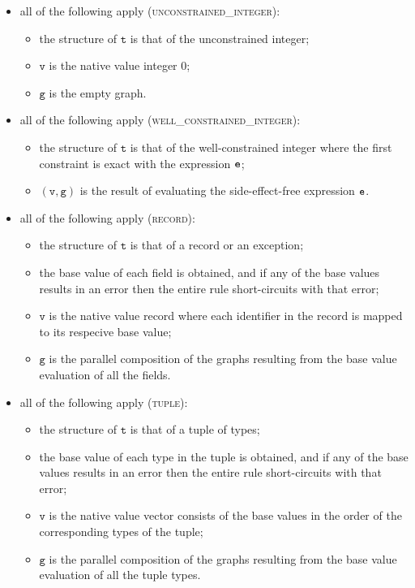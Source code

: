 \documentclass{book}
\newcommand\vg[0]{\texttt{g}}
\newcommand\vv[0]{\texttt{v}}
\newcommand\vt[0]{\texttt{t}}
\begin{document}
\begin{itemize}
  \item all of the following apply (\textsc{unconstrained\_integer}):
  \begin{itemize}
    \item the structure of $\vt$ is that of the unconstrained integer;
    \item $\vv$ is the native value integer $0$;
    \item $\vg$ is the empty graph.
  \end{itemize}

  \item all of the following apply (\textsc{well\_constrained\_integer}):
  \begin{itemize}
    \item the structure of $\vt$ is that of the well-constrained integer where the first constraint
    is exact with the expression $\texttt{e}$;
    \item $(\vv, \vg)$ is the result of evaluating the side-effect-free expression $\texttt{e}$.
  \end{itemize}

  \item all of the following apply (\textsc{record}):
  \begin{itemize}
    \item the structure of $\vt$ is that of a record or an exception;
    \item the base value of each field is obtained, and if any of the base values results in an error
    then the entire rule short-circuits with that error;
    \item $\vv$ is the native value record where each identifier in the record is mapped to its
    respecive base value;
    \item $\vg$ is the parallel composition of the graphs resulting from the base value evaluation
    of all the fields.
  \end{itemize}

  \item all of the following apply (\textsc{tuple}):
  \begin{itemize}
    \item the structure of $\vt$ is that of a tuple of types;
    \item the base value of each type in the tuple is obtained, and if any of the base values results in an error
    then the entire rule short-circuits with that error;
    \item $\vv$ is the native value vector consists of the base values in the order of the corresponding types
    of the tuple;
    \item $\vg$ is the parallel composition of the graphs resulting from the base value evaluation
    of all the tuple types.
  \end{itemize}


\end{itemize}
\end{document}
